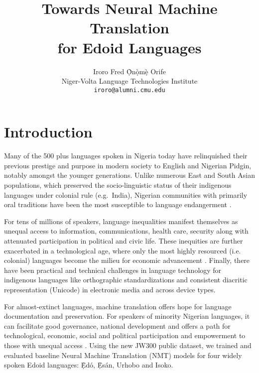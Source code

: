 \documentclass{article} %
\title{Towards Neural Machine Translation \\ for Edoid Languages}
\author{Iroro Fred \d{\`O}n\d{\`o}m\d{\`e} Orife \\
Niger-Volta Language Technologies Institute\\
\texttt{iroro@alumni.cmu.edu}
}
\begin{document}
\maketitle



\section{Introduction}

Many of the 500 plus languages spoken in Nigeria today have relinquished their previous prestige and purpose in modern society to English and Nigerian Pidgin, notably amongst the younger generations. Unlike numerous East and South Asian populations, which preserved the socio-linguistic status of their indigenous languages under colonial rule (e.g.\ India), Nigerian communities with primarily oral traditions have been the most susceptible to language endangerment \citep{rolle2013phonetics, omo2004esan}.

For tens of millions of speakers, language inequalities manifest themselves as unequal access to information, communications, health care, security along with attenuated participation in political and civic life. These inequities are further exacerbated in a technological age, where only the most highly resourced (i.e. colonial) languages become the milieu for economic advancement \citep{odojelanguage, awobuluyi201626, ganagana2019contrastive}. Finally, there have been practical and technical challenges in language technology for indigenous languages like orthographic standardizations and consistent diacritic representation (Unicode) in electronic media and across device types. 

For almost-extinct languages, machine translation offers hope for language documentation and preservation. For speakers of minority Nigerian languages, it can facilitate good governance, national development and offers a path for technological, economic, social and political participation and empowerment to those with unequal access \citep{odoje201612, odojelanguage}. Using the new JW300 public dataset, we trained and evaluated baseline Neural Machine Translation (NMT) models for four widely spoken Edoid languages: \d{\`E}d{\'o}, \d{\`E}s{\'a}n, Urhobo and Isoko. 
\end{document}
